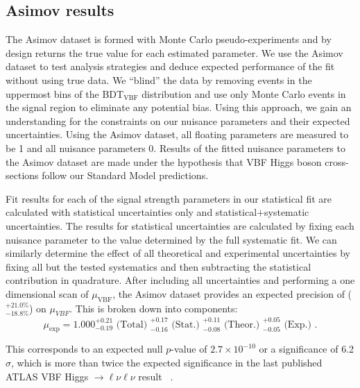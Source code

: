 \subsection{Asimov results}
The Asimov dataset is formed with Monte Carlo pseudo-experiments and by design returns the true value for each estimated parameter. We use the Asimov dataset to test analysis strategies and deduce expected performance of the fit without using true data. We ``blind'' the data by removing events in the uppermost bins of the BDT$_{\text{VBF}}$ distribution and use only Monte Carlo events in the signal region to eliminate any potential bias. Using this approach, we gain an understanding for the constraints on our nuisance parameters and their expected uncertainties. Using the Asimov dataset, all floating parameters are measured to be 1 and all nuisance parameters 0. Results of the fitted nuisance parameters to the Asimov dataset are made under the hypothesis that VBF Higgs boson cross-sections follow our Standard Model predictions. 

Fit results for each of the signal strength parameters in our statistical fit are calculated with statistical uncertainties only and statistical$+$systematic uncertainties. The results for statistical uncertainties are calculated by fixing each nuisance parameter to the value determined by the full systematic fit. We can similarly determine the effect of all theoretical and experimental uncertainties by fixing all but the tested systematics and then subtracting the statistical contribution in quadrature. After including all uncertainties and performing a one dimensional scan of $\mu_\text{VBF}$, the Asimov dataset provides an expected precision of ($^{+21.0\%}_{-18.8\%}$) on $\mu_{VBF}$. This is broken down into components:
\begin{equation}
\mu_{\text{exp}} = 1.000 ^{+0.21}_{-0.19} \text{ (Total) } ^{+0.17}_{-0.16} \text{ (Stat.) } ^{+0.11}_{-0.08} \text{ (Theor.) } ^{+0.05}_{-0.05} \text{ (Exp.) }.
\end{equation}

This corresponds to an expected null $p$-value of $2.7\times10^{-10}$ or a significance of 6.2$\sigma$, which is more than twice the expected significance in the last published ATLAS VBF Higgs $\rightarrow \ell\nu\ell\nu$ result ~\cite{Aaboud_2019}.   

